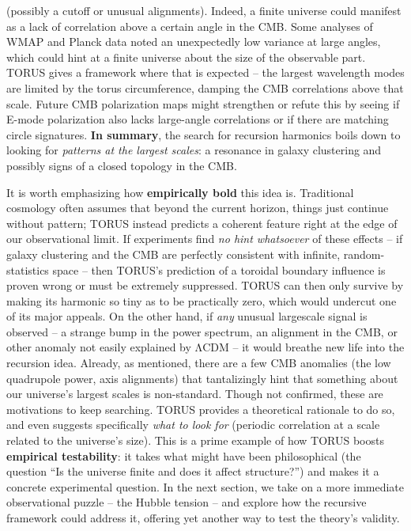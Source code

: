 \documentclass[]{article}
\begin{document}
(possibly a cutoff or unusual alignments). Indeed, a finite universe
could manifest as a lack of correlation above a certain angle in the
CMB. Some analyses of WMAP and Planck data noted an unexpectedly low
variance at large angles, which could hint at a finite universe about
the size of the observable part. TORUS gives a framework where that is
expected -- the largest wavelength modes are limited by the torus
circumference, damping the CMB correlations above that scale. Future CMB
polarization maps might strengthen or refute this by seeing if E-mode
polarization also lacks large-angle correlations or if there are
matching circle signatures. \textbf{In summary}, the search for
recursion harmonics boils down to looking for \emph{patterns at the
largest scales}: a resonance in galaxy clustering and possibly signs of
a closed topology in the CMB.

It is worth emphasizing how \textbf{empirically bold} this idea is.
Traditional cosmology often assumes that beyond the current horizon,
things just continue without pattern; TORUS instead predicts a coherent
feature right at the edge of our observational limit. If experiments
find \emph{no hint whatsoever} of these effects -- if galaxy clustering
and the CMB are perfectly consistent with infinite, random-statistics
space -- then TORUS's prediction of a toroidal boundary influence is
proven wrong or must be extremely suppressed​. TORUS can then only
survive by making its harmonic so tiny as to be practically zero, which
would undercut one of its major appeals. On the other hand, if
\emph{any} unusual largescale signal is observed -- a strange bump in
the power spectrum, an alignment in the CMB, or other anomaly not easily
explained by ΛCDM -- it would breathe new life into the recursion idea.
Already, as mentioned, there are a few CMB anomalies (the low quadrupole
power, axis alignments) that tantalizingly hint that something about our
universe's largest scales is non-standard​. Though not confirmed, these
are motivations to keep searching. TORUS provides a theoretical
rationale to do so, and even suggests specifically \emph{what to look
for} (periodic correlation at a scale related to the universe's size).
This is a prime example of how TORUS boosts \textbf{empirical
testability}: it takes what might have been philosophical (the question
``Is the universe finite and does it affect structure?'') and makes it a
concrete experimental question. In the next section, we take on a more
immediate observational puzzle -- the Hubble tension -- and explore how
the recursive framework could address it, offering yet another way to
test the theory's validity.
\end{document}
